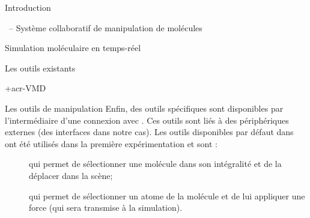 \documentclass[myfrancais]{mythesis}
\begin{document}
\begin{mypart}{Introduction}
\begin{mychapter}{\myShaddock\ -- Système collaboratif de manipulation de molécules}
\begin{mysection}{Simulation moléculaire en temps-réel}
\begin{mysubsection}{Les outils existants}
\begin{mysubsubsection}{\myacronl+{acr-VMD}}
\begin{myparagraph}{Les outils de manipulation}
							Enfin, des outils spécifiques sont disponibles par l'intermédiaire d'une connexion avec  .
							Ces outils sont liés à des périphériques externes (des interfaces \myOmni dans notre cas).
							Les outils disponibles par défaut dans  ont été utilisés dans la première expérimentation  et sont :
							\begin{description}
								\item[] qui permet de sélectionner une molécule dans son intégralité et de la déplacer dans la scène;
								\item[] qui permet de sélectionner un atome de la molécule et de lui appliquer une force (qui sera transmise à la simulation).
							\end{description}


\end{myparagraph}
\end{mysubsubsection}
\end{mysubsection}
\end{mysection}
\end{mychapter}
\end{mypart}
\end{document}
